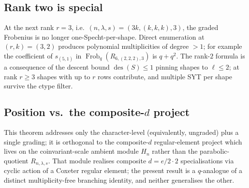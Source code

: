 \documentclass[11pt]{article}
\theoremstyle{definition}
\theoremstyle{remark}
\DeclareMathOperator{\Frob}{Frob}
\DeclareMathOperator{\des}{des}
\begin{document}
\subsection*{Rank two is special}

At the next rank $r = 3$, i.e.\ $(n,\lambda,s) = (3k,(k,k,k),3)$, the graded
Frobenius is no longer one-Specht-per-shape. Direct enumeration at
$(r,k) = (3,2)$ produces polynomial multiplicities of degree $> 1$; for
example the coefficient of $s_{(5,1)}$ in $\Frob_q(R_{6,(2,2,2),3})$ is
$q + q^2$. The rank-$2$ formula is a consequence of the descent bound
$\des(S) \le 1$ pinning shapes to $\ell \le 2$; at rank $r \ge 3$ shapes with
up to $r$ rows contribute, and multiple SYT per shape survive the ctype
filter.

\subsection*{Position vs.\ the composite-$d$ project}

This theorem addresses only the character-level (equivalently, ungraded)
plus a single grading; it is orthogonal to the composite-$d$ regular-element
project which lives on the coinvariant-scale ambient module $H_n$ rather
than the parabolic-quotient $R_{n,\lambda,s}$. That module realises composite
$d = e/2 \cdot 2$ specialisations via cyclic action of a Coxeter regular
element; the present result is a $q$-analogue of a distinct multiplicity-free
branching identity, and neither generalises the other.
\end{document}
